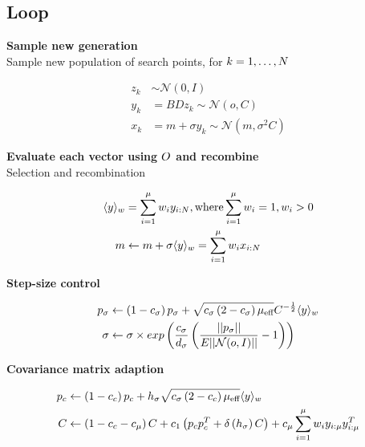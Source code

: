 \subsection{Loop}

\textbf{Sample new generation}\\
Sample new population of search points, for $k = 1, \dots, N$

\begin{align*}
z_{k} &\sim \mathcal{N}(0, I)\\
y_{k} &= BDz_{k} \sim \mathcal{N}(o, C)\\
x_{k} &= m + \sigma y_{k} \sim \mathcal{N}(m, \sigma^2 C)
\end{align*}

\textbf{Evaluate each vector using $O$ and recombine}\\
Selection and recombination

\begin{align*}
\langle y \rangle_{w} &= \sum^{\mu}_{i = 1}w_{i} y_{i : N}, \text{where} \sum^{\mu}_{i = 1} w_{i} = 1, w_{i} > 0\\
m &\leftarrow m + \sigma \langle y \rangle_{w} = \sum^{\mu}_{i = 1} w_{i}x_{i:N}
\end{align*}

\textbf{Step-size control}

\begin{align*}
p_{\sigma} &\leftarrow \left( 1 - c_{\sigma} \right) p_{\sigma} + \sqrt{c_{\sigma} \left( 2 - c_{\sigma} \right) \mu_{\text{eff}}} C^{- \frac{1}{2}} \langle y \rangle_{w}\\
\sigma &\leftarrow \sigma \times exp \left( \frac{c_{\sigma}}{d_{\sigma}} \left( \frac{||p_{\sigma}||}{E|| \mathcal{N}(o, I) ||} - 1 \right) \right)
\end{align*}

\textbf{Covariance matrix adaption}

\begin{align*}
p_{c} &\leftarrow \left( 1 - c_{c} \right) p_{c} + h_{\sigma} \sqrt{c_{\sigma} \left( 2 - c_{c} \right) \mu_{\text{eff}}} \langle y \rangle_{w}\\
C &\leftarrow \left( 1 - c_{c} - c_{\mu} \right) C + c_{1} \left( p_{c} p_{c}^{T} + \delta \left( h_{\sigma} \right) C \right) + c_{\mu} \sum^{\mu}_{i = 1} w_{i} y_{i : \mu} y_{i : \mu} ^{T}
\end{align*}







